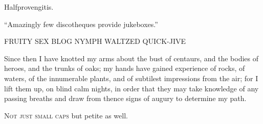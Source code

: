 \documentclass[a4paper,14pt]{memoir}
\begin{document}
\newpage
\em{
Halfprovengitis.

``Amazingly few discotheques provide jukeboxes.''

{FRUITY SEX BLOG NYMPH WALTZED QUICK-JIVE}

{\quotation
Since then I have knotted my arms about the bust of centaurs, and the bodies of heroes, and the trunks of oaks; my
hands have gained experience of rocks, of waters, of the innumerable plants, and of subtilest impressions from the air;
for I lift them up, on blind calm nights, in order that they may take knowledge of any passing breaths and draw from
thence signs of augury to determine my path.
}

\textsc{Not just small caps} but {petite as well}.

}
\end{document}
